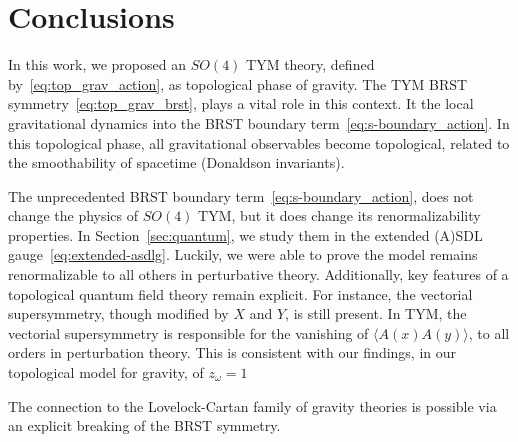 \documentclass[../main.tex]{subfiles}
\begin{document}
\section{Conclusions}%
\label{sec:conclusions}

In this work, we proposed an $ SO \left( 4 \right) $ TYM theory, defined by~\eqref{eq:top_grav_action}, as topological phase of gravity. The TYM BRST symmetry~\eqref{eq:top_grav_brst}, plays a vital role in this context. It  the local gravitational dynamics into the BRST boundary term~\eqref{eq:s-boundary_action}. In this topological phase, all gravitational observables become topological, related to the smoothability of spacetime (Donaldson invariants).

The unprecedented BRST boundary term~\eqref{eq:s-boundary_action}, does not change the physics of $ SO(4) $ TYM, but it does change its renormalizability properties. In Section~\ref{sec:quantum}, we study them in the extended (A)SDL gauge~\eqref{eq:extended-asdlg}. Luckily, we were able to prove the model remains renormalizable to all others in perturbative theory. Additionally, key features of a topological quantum field theory remain explicit. For instance, the vectorial supersymmetry, though modified by $ X $ and $ Y $, is still present. In TYM, the vectorial supersymmetry is responsible for the vanishing of $ \langle A(x) A(y) \rangle $, to all orders in perturbation theory. This is consistent with our findings, in our topological model for gravity, of $ z_{ \omega } = 1 $

The connection to the Lovelock-Cartan family of gravity theories is possible via an explicit breaking of the BRST symmetry.
\end{document}
